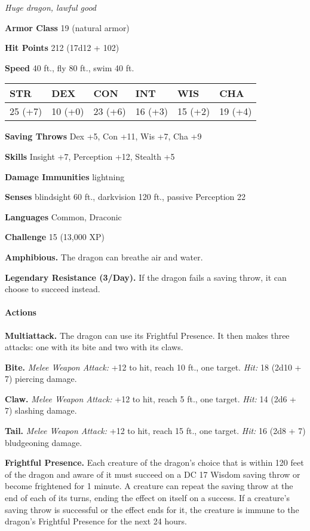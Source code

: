 \documentclass[
]{article}
\begin{document}
\emph{Huge dragon, lawful good}

\textbf{Armor Class} 19 (natural armor)

\textbf{Hit Points} 212 (17d12 + 102)

\textbf{Speed} 40 ft., fly 80 ft., swim 40 ft.

\begin{longtable}[]{@{}llllll@{}}
\toprule
STR & DEX & CON & INT & WIS & CHA\tabularnewline
\midrule
\endhead
25 (+7) & 10 (+0) & 23 (+6) & 16 (+3) & 15 (+2) & 19 (+4)\tabularnewline
\bottomrule
\end{longtable}

\textbf{Saving Throws} Dex +5, Con +11, Wis +7, Cha +9

\textbf{Skills} Insight +7, Perception +12, Stealth +5

\textbf{Damage Immunities} lightning

\textbf{Senses} blindsight 60 ft., darkvision 120 ft., passive
Perception 22

\textbf{Languages} Common, Draconic

\textbf{Challenge} 15 (13,000 XP)

\textbf{Amphibious.} The dragon can breathe air and water.

\textbf{Legendary Resistance (3/Day).} If the dragon fails a saving
throw, it can choose to succeed instead.

\hypertarget{actions-48}{%
\paragraph{Actions}\label{actions-48}}

\textbf{Multiattack.} The dragon can use its Frightful Presence. It then
makes three attacks: one with its bite and two with its claws.

\textbf{Bite.} \emph{Melee Weapon Attack:} +12 to hit, reach 10 ft., one
target. \emph{Hit:} 18 (2d10 + 7) piercing damage.

\textbf{Claw.} \emph{Melee Weapon Attack:} +12 to hit, reach 5 ft., one
target. \emph{Hit:} 14 (2d6 + 7) slashing damage.

\textbf{Tail.} \emph{Melee Weapon Attack:} +12 to hit, reach 15 ft., one
target. \emph{Hit:} 16 (2d8 + 7) bludgeoning damage.

\textbf{Frightful Presence.} Each creature of the dragon's choice that
is within 120 feet of the dragon and aware of it must succeed on a DC 17
Wisdom saving throw or become frightened for 1 minute. A creature can
repeat the saving throw at the end of each of its turns, ending the
effect on itself on a success. If a creature's saving throw is
successful or the effect ends for it, the creature is immune to the
dragon's Frightful Presence for the next 24 hours.
\end{document}

